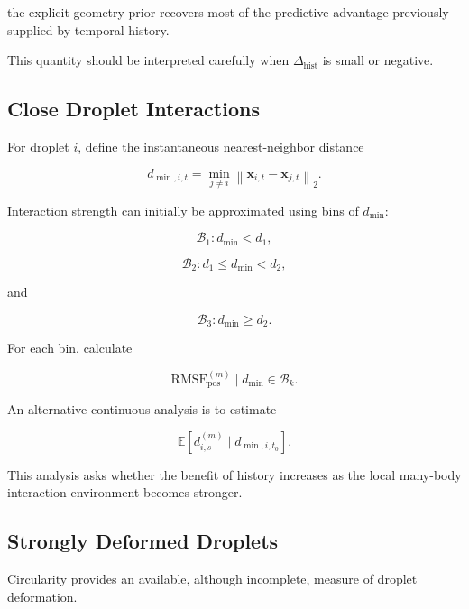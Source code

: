 \documentclass[11pt]{article}
\newcommand{\x}{\mathbf{x}}
\begin{document}
the explicit geometry prior recovers most of the predictive advantage previously supplied by temporal history.

This quantity should be interpreted carefully when \(\Delta_{\mathrm{hist}}\) is small or negative.

\subsection{Close Droplet Interactions}

For droplet \(i\), define the instantaneous nearest-neighbor distance

\begin{equation}
d_{\min,i,t}
=
\min_{j\neq i}
\left\|
\x_{i,t}
-
\x_{j,t}
\right\|_2.
\end{equation}

Interaction strength can initially be approximated using bins of \(d_{\min}\):

\begin{equation}
\mathcal{B}_1:
d_{\min}<d_1,
\end{equation}

\begin{equation}
\mathcal{B}_2:
d_1\le d_{\min}<d_2,
\end{equation}

and

\begin{equation}
\mathcal{B}_3:
d_{\min}\ge d_2.
\end{equation}

For each bin, calculate

\begin{equation}
\mathrm{RMSE}_{\mathrm{pos}}^{(m)}
\mid
d_{\min}\in\mathcal{B}_k.
\end{equation}

An alternative continuous analysis is to estimate

\begin{equation}
\mathbb{E}
\left[
d_{i,s}^{(m)}
\mid
d_{\min,i,t_0}
\right].
\end{equation}

This analysis asks whether the benefit of history increases as the local many-body interaction environment becomes stronger.

\subsection{Strongly Deformed Droplets}

Circularity provides an available, although incomplete, measure of droplet deformation.
\end{document}
